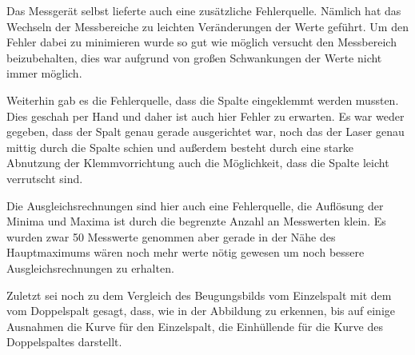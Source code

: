 Das Messgerät selbst lieferte auch eine zusätzliche Fehlerquelle. Nämlich hat das Wechseln der Messbereiche zu leichten Veränderungen der Werte geführt. Um den Fehler dabei zu minimieren wurde so gut wie möglich versucht den Messbereich beizubehalten, dies war aufgrund von großen Schwankungen der Werte nicht immer möglich.

Weiterhin gab es die Fehlerquelle, dass die Spalte eingeklemmt werden mussten. Dies geschah per Hand und daher ist auch hier Fehler zu erwarten. Es war weder gegeben, dass der Spalt genau gerade ausgerichtet war, noch das der Laser genau mittig durch die Spalte schien und außerdem besteht durch eine starke Abnutzung der Klemmvorrichtung auch die Möglichkeit, dass die Spalte leicht verrutscht sind.

Die Ausgleichsrechnungen sind hier auch eine Fehlerquelle, die Auflösung der Minima und Maxima ist durch die begrenzte Anzahl an Messwerten klein. Es wurden zwar 50 Messwerte genommen aber gerade in der Nähe des Hauptmaximums wären noch mehr werte nötig gewesen um noch bessere Ausgleichsrechnungen zu erhalten.

Zuletzt sei noch zu dem Vergleich des Beugungsbilds vom Einzelspalt mit dem vom Doppelspalt gesagt, dass, wie in der Abbildung zu erkennen, bis auf einige Ausnahmen die Kurve für den Einzelspalt, die Einhüllende für die Kurve des Doppelspaltes darstellt.
